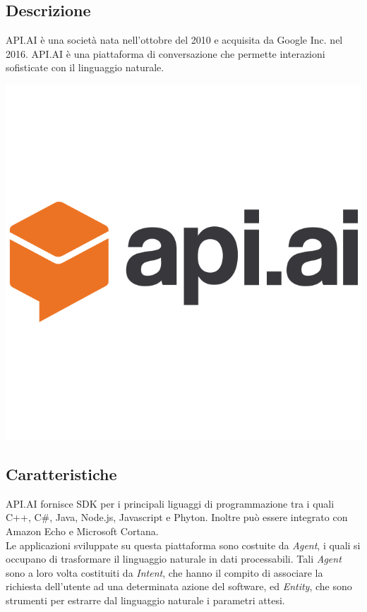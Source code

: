 \documentclass[a4paper,titlepage]{article}
\begin{document}
	\subsection{Descrizione}
	\begin{minipage}{0.7\textwidth}\raggedright
		API.AI è una società nata nell'ottobre del 2010 e acquisita da Google Inc. nel 2016.
		API.AI è una piattaforma di conversazione che permette interazioni sofisticate con il linguaggio naturale.
	\end{minipage}
	\hfill
	\noindent\begin{minipage}{0.1\textwidth}
		\includegraphics[scale=0.15]{images/apiai.png}
	\end{minipage}
	\subsection{Caratteristiche}
	API.AI fornisce SDK per i principali liguaggi di programmazione tra i quali C++, C\#, Java, Node.js, Javascript e Phyton. Inoltre può essere integrato con Amazon Echo e Microsoft Cortana.\\
	Le applicazioni sviluppate su questa piattaforma sono costuite da \textit{Agent}, i quali si occupano di trasformare il linguaggio naturale in dati processabili.
	Tali \textit{Agent} sono a loro volta costituiti da \textit{Intent}, che hanno il compito di associare la richiesta dell'utente ad una determinata azione del software, ed \textit{Entity}, che sono strumenti per estrarre dal linguaggio naturale i parametri attesi.\\
	
\end{document}
